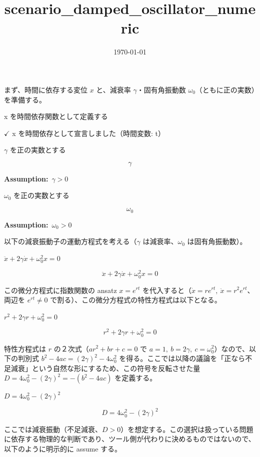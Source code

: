 \documentclass[dvipdfmx,a4paper,11pt]{jsarticle}
\title{scenario\_damped\_oscillator\_numeric}
\date{\today}
\begin{document}
\maketitle

まず、時間に依存する変位 $x$ と、減衰率 $\gamma$・固有角振動数 $\omega_0$（ともに正の実数）を準備する。

x を時間依存関数として定義する

$\checkmark$ x を時間依存として宣言しました（時間変数: t）

$\gamma$ を正の実数とする

\[
  \gamma
\]

\noindent\textbf{Assumption:}\ $\displaystyle \gamma > 0$\par

$\omega_0$ を正の実数とする

\[
  \omega_{0}
\]

\noindent\textbf{Assumption:}\ $\displaystyle \omega_{0} > 0$\par

以下の減衰振動子の運動方程式を考える（$\gamma$ は減衰率、$\omega_0$ は固有角振動数）。

$\ddot{x} + 2 \gamma \dot{x} + \omega_0^2 x = 0$

\begin{equation}
  \ddot{x} + 2 \gamma \dot{x} + \omega_0^2 x = 0
  \label{eq:E1}
\end{equation}

この微分方程式に指数関数の ansatz $x=e^{rt}$ を代入すると（$\dot x=re^{rt},\ \ddot x=r^2e^{rt}$、両辺を $e^{rt}\neq0$ で割る）、この微分方程式の特性方程式は以下となる。

$r^2 + 2 \gamma r + \omega_0^2 = 0$

\begin{equation}
  r^2 + 2 \gamma r + \omega_0^2 = 0
  \label{eq:E2}
\end{equation}

特性方程式は $r$ の２次式（$ar^2+br+c=0$ で $a=1,\ b=2\gamma,\ c=\omega_0^2$）なので、以下の判別式 $b^2-4ac=(2\gamma)^2-4\omega_0^2$ を得る。ここでは以降の議論を「正なら不足減衰」という自然な形にするため、この符号を反転させた量 $D=4\omega_0^2-(2\gamma)^2=-(b^2-4ac)$ を定義する。

$D = 4 \omega_0^2 - (2 \gamma)^2$

\begin{equation}
  D = 4 \omega_0^2 - (2 \gamma)^2
  \label{eq:E3}
\end{equation}

ここでは減衰振動（不足減衰、$D>0$）を想定する。この選択は扱っている問題に依存する物理的な判断であり、ツール側が代わりに決めるものではないので、以下のように明示的に assume する。
\end{document}
